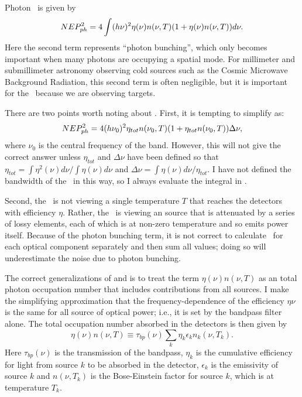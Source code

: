 Photon \NEP\ is given by \cite[Equation~51]{zmuidzinas_thermal_2003}
\begin{equation} \label{eqn:ch4-photon-nep}
  NEP_{ph}^2 = 4 \int (h \nu)^2 \eta(\nu) n(\nu,T) (1 + \eta(\nu) n(\nu,T)) d \nu.
\end{equation}
Here the second term represents ``photon bunching'', which only becomes important when many photons are occupying a spatial mode.
For millimeter and submillimeter astronomy observing cold sources such as the Cosmic Microwave Background Radiation, this second term is often negligible, but it is important for the \Imager\ because we are observing  targets.

There are two points worth noting about .
First, it is tempting to simplify  as:
\begin{equation}
  NEP_{ph}^2 = 4 (h \nu_0)^2 \eta_{tot} n(\nu_0,T) (1 + \eta_{tot} n(\nu_0,T)) \Delta \nu,
\end{equation}
where $\nu_0$ is the central frequency of the band.
However, this will not give the correct answer unless $\eta_{tot}$ and $\Delta \nu$ have been defined so that $\eta_{tot} = \int \eta^2(\nu) d\nu / \int \eta(\nu) d\nu$ and $\Delta \nu = \int \eta(\nu) d \nu / \eta_{tot}$.
I have not defined the bandwidth of the \Imager\ in this way, so I always evaluate the integral in .

Second, the \Imager\ is not viewing a single temperature $T$ that reaches the detectors with efficiency $\eta$.
Rather, the \Imager\ is viewing an  source that is attenuated by a series of lossy elements, each of which is at non-zero temperature and so emits power itself.
Because of the photon bunching term, it is not correct to calculate \NEPph\ for each optical component separately and then sum all values; doing so will underestimate the noise due to photon bunching.

The correct generalizations of  and  is to treat the term $\eta(\nu) n(\nu,T)$ as an total photon occupation number that includes contributions from all sources.
I make the simplifying approximation that the frequency-dependence of the efficiency $\eta{\nu}$ is the same for all source of optical power; i.e., it is set by the bandpass filter alone.
The total occupation number absorbed in the detectors is then given by
\begin{equation} \label{eqn:ch4-tot-n0}
  \eta(\nu) n(\nu,T) \equiv \tau_{bp}(\nu) \sum_k \eta_k \epsilon_k n_k(\nu,T_k).
\end{equation}
Here $\tau_{bp}(\nu)$ is the transmission of the bandpass, $\eta_k$ is the cumulative efficiency for light from source $k$ to be absorbed in the detector, $\epsilon_k$ is the emissivity of source $k$ and $n(\nu,T_k)$ is the Bose-Einstein factor  for source $k$, which is at temperature $T_k$.

